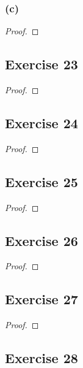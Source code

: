 \documentclass[14pt]{extarticle}
\begin{document}
\subsubsection{(c)}

\begin{proof}

\end{proof}

\subsection{Exercise 23}

\begin{proof}

\end{proof}

\subsection{Exercise 24}

\begin{proof}

\end{proof}

\subsection{Exercise 25}

\begin{proof}

\end{proof}

\subsection{Exercise 26}

\begin{proof}

\end{proof}

\subsection{Exercise 27}

\begin{proof}

\end{proof}

\subsection{Exercise 28}
\end{document}
